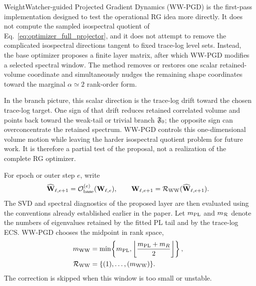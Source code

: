WeightWatcher-guided Projected Gradient Dynamics (WW-PGD) is the first-pass implementation designed to test the operational RG idea more directly.  It does not compute the sampled isospectral quotient of Eq.~\eqref{eq:optimizer_full_projector}, and it does not attempt to remove the complicated isospectral directions tangent to fixed trace-log level sets.  Instead, the base optimizer proposes a finite layer matrix, after which WW-PGD modifies a selected spectral window.  The method removes or restores one scalar retained-volume coordinate and simultaneously nudges the remaining shape coordinates toward the marginal $\alpha\simeq2$ rank-order form.

In the branch picture, this scalar direction is the trace-log drift toward the chosen trace-log target.  One sign of that drift reduces retained correlated volume and points back toward the weak-tail or trivial branch $\mathfrak F_0$; the opposite sign can overconcentrate the retained spectrum.  WW-PGD controls this one-dimensional volume motion while leaving the harder isospectral quotient problem for future work.  It is therefore a partial test of the proposal, not a realization of the complete RG optimizer.

\begin{center}
\label{fig:wwpgd_optimizer}
\end{center}

For epoch or outer step $e$, write
\begin{equation}
  \widehat{\mathbf W}_{\ell,e+1}
  =
  \mathcal O_{\rm base}^{(e)}(\mathbf W_{\ell,e}),
  \qquad
  \mathbf W_{\ell,e+1}
  =
  \mathcal R_{\rm WW}(\widehat{\mathbf W}_{\ell,e+1}).
  \label{eq:wwpgd_outer_map}
\end{equation}
The SVD and spectral diagnostics of the proposed layer are then evaluated using the conventions already established earlier in the paper.  Let $m_{\rm PL}$ and $m_{\mathcal R}$ denote the numbers of eigenvalues retained by the fitted PL tail and by the trace-log ECS.  WW-PGD chooses the midpoint in rank space,
\begin{equation}
\begin{aligned}
m_{\mathrm{WW}}
&= \min\!\left\{
m_{\mathrm{PL}},
\left\lfloor \frac{m_{\mathrm{PL}}+m_R}{2} \right\rfloor
\right\}, \\
\mathcal R_{\rm WW}
&= \{(1),\ldots,(m_{\rm WW})\}.
\end{aligned}
\label{eq:wwpgd_midpoint_window}
\end{equation}
The correction is skipped when this window is too small or unstable.

